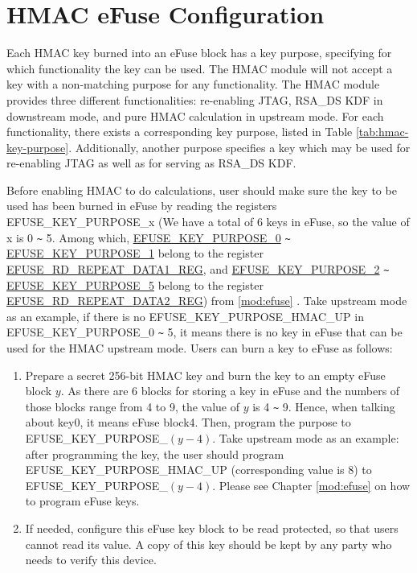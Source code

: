 \documentclass[main\_\_EN.tex]{subfiles}
\begin{document}
\section{HMAC eFuse Configuration}
\label{sec:hmac-config-function}

Each HMAC key burned into an eFuse block has a key purpose, specifying for which functionality the key can be used. The HMAC module will not accept a key with a non-matching purpose for any functionality. The HMAC module provides three different functionalities: re-enabling JTAG, RSA\_DS KDF in downstream mode, and pure HMAC calculation in upstream mode. For each functionality, there exists a corresponding key purpose, listed in Table \ref{tab:hmac-key-purpose}. Additionally, another purpose specifies a key which may be used for re-enabling JTAG as well as for serving as RSA\_DS KDF.

Before enabling HMAC to do calculations, user should make sure the key to be used has been burned in eFuse by reading the registers EFUSE\_KEY\_PURPOSE\_x (We have a total of 6 keys in eFuse, so the value of x is 0 \verb+~+ 5. Among which, \hyperref[fielddesc:EFUSEKEYPURPOSE0]{EFUSE\_KEY\_PURPOSE\_0} \verb+~+ \hyperref[fielddesc:EFUSEKEYPURPOSE1]{EFUSE\_KEY\_PURPOSE\_1} belong to the register \hyperref[regdesc:EFUSERDREPEATDATA1REG]{EFUSE\_RD\_REPEAT\_DATA1\_REG}, and \hyperref[fielddesc:EFUSEKEYPURPOSE2]{EFUSE\_KEY\_PURPOSE\_2} \verb+~+ \hyperref[fielddesc:EFUSEKEYPURPOSE5]{EFUSE\_KEY\_PURPOSE\_5} belong to the register \hyperref[regdesc:EFUSERDREPEATDATA2REG]{EFUSE\_RD\_REPEAT\_DATA2\_REG}) from \ref{mod:efuse} \textit{}. Take upstream mode as an example, if there is no EFUSE\_KEY\_PURPOSE\_HMAC\_UP in EFUSE\_KEY\_PURPOSE\_0 \verb+~+ 5, it means there is no key in eFuse that can be used for the HMAC upstream mode. Users can burn a key to eFuse as follows:

\begin{enumerate}
    \item Prepare a secret 256-bit HMAC key and burn the key to an empty eFuse block $y$. As there are 6 blocks for storing a key in eFuse and the numbers of those blocks range from 4 to 9, the value of $y$ is 4 \verb+~+ 9. Hence, when talking about key0, it means eFuse block4. Then, program the purpose to EFUSE\_KEY\_PURPOSE\_$(y-4)$. Take upstream mode as an example: after programming the key, the user should program EFUSE\_KEY\_PURPOSE\_HMAC\_UP (corresponding value is 8) to EFUSE\_KEY\_PURPOSE\_$(y-4)$. Please see Chapter \ref{mod:efuse} \textit{} on how to program eFuse keys.
    \item If needed, configure this eFuse key block to be read protected, so that users cannot read its value. A copy of this key should be kept by any party who needs to verify this device.
\end{enumerate}
\end{document}
